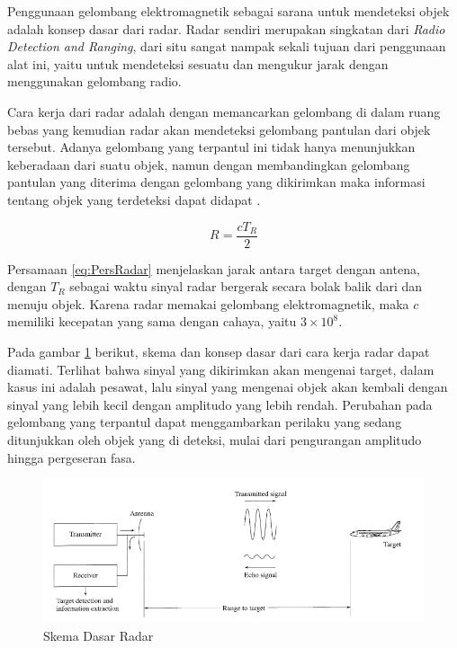 Penggunaan gelombang elektromagnetik sebagai sarana untuk mendeteksi objek adalah konsep dasar dari radar. Radar sendiri merupakan singkatan dari \textit{Radio Detection and Ranging}, dari situ sangat nampak sekali tujuan dari penggunaan alat ini, yaitu untuk mendeteksi sesuatu dan mengukur jarak dengan menggunakan gelombang radio. 

Cara kerja dari radar adalah dengan memancarkan gelombang di dalam ruang bebas yang kemudian radar akan mendeteksi gelombang pantulan dari objek tersebut. Adanya gelombang yang terpantul ini tidak hanya menunjukkan keberadaan dari suatu objek, namun dengan membandingkan gelombang pantulan yang diterima dengan gelombang yang dikirimkan maka informasi tentang objek yang terdeteksi dapat didapat \cite{Skolnik2001}.

\begin{equation}
	R = \frac{cT_{R}}{2}
	\label{eq:PersRadar}
\end{equation}

Persamaan \ref{eq:PersRadar} menjelaskan jarak antara target dengan antena, dengan $T_{R}$ sebagai waktu sinyal radar bergerak secara bolak balik dari dan menuju objek. Karena radar memakai gelombang elektromagnetik, maka $c$ memiliki kecepatan yang sama dengan cahaya, yaitu $3 \times 10 ^{8}$.

Pada gambar \ref{pic:skemaRadar} berikut, skema dan konsep dasar dari cara kerja radar dapat diamati. Terlihat bahwa sinyal yang dikirimkan akan mengenai target, dalam kasus ini adalah pesawat, lalu sinyal yang mengenai objek akan kembali dengan sinyal yang lebih kecil dengan amplitudo yang lebih rendah. Perubahan pada gelombang yang terpantul dapat menggambarkan perilaku yang sedang ditunjukkan oleh objek yang di deteksi, mulai dari pengurangan amplitudo hingga pergeseran fasa.

\begin{figure}
	\begin{center}
		\includegraphics[scale=0.5]{pics/bab2/skemaradar.png} 
		\caption[Skema Dasar Radar]{{Skema Dasar Radar} \cite{Skolnik2001}}
		\label{pic:skemaRadar}
	\end{center}
\end{figure}


